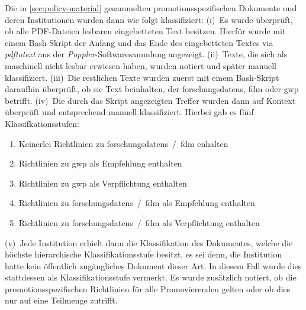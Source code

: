 Die in \cref{sec:policy-material} gesammelten promotionsspezifischen Dokumente und deren Institutionen wurden dann wie folgt klassifiziert:
(i)~Es wurde überprüft, ob alle PDF-Dateien lesbaren eingebetteten Text besitzen.
Hierfür wurde mit einem Bash-Skript \autocite{my-dataset} der Anfang und das Ende des eingebetteten Textes via \emph{pdftotext} aus der \emph{Poppler}-Softwaresammlung \autocite{Poppler} angezeigt.
% 
(ii)~Texte, die sich als maschinell nicht lesbar erwiesen haben, wurden notiert und später manuell klassifiziert.
(iii)~Die restlichen Texte wurden zuerst mit einem Bash-Skript \autocite{my-dataset} daraufhin überprüft, ob sie Text beinhalten, der \glspl{forschungsdaten}, \gls{fdm} oder \gls{gwp} betrifft.
% 
(iv)~Die durch das Skript angezeigten Treffer wurden dann auf Kontext überprüft und entsprechend manuell klassifiziert.
Hierbei gab es fünf Klassifkationsstufen:
\begin{enumerate}
    \item Keinerlei Richtlinien zu \glspl{forschungsdaten}~/~\gls{fdm} enhalten
    \item Richtlinien zu \gls{gwp} als Empfehlung enthalten
    \item Richtlinien zu \gls{gwp} als Verpflichtung enthalten
    \item Richtlinien zu \glspl{forschungsdaten}~/~\gls{fdm} als Empfehlung enthalten
    \item Richtlinien zu \glspl{forschungsdaten}~/~\gls{fdm} als Verpflichtung enthalten
\end{enumerate}
(v)~Jede Institution erhielt dann die Klassifikation des Dokumentes, welche die höchste hierarchische Klassifikationsstufe besitzt, es sei denn, die Institution hatte kein öffentlich zugängliches Dokument dieser Art.
In diesem Fall wurde dies stattdessen als Klassifikationsstufe vermerkt.
Es wurde zusätzlich notiert, ob die promotionsspezifischen Richtlinien für alle Promovierenden gelten oder ob dies nur auf eine Teilmenge zutrifft.
\pagebreak

